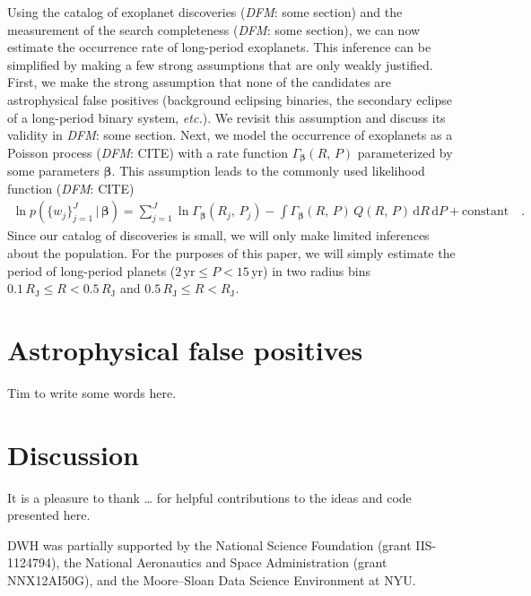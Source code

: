 \documentclass[manuscript, letterpaper]{aastex6}
\newcommand{\foreign}[1]{\emph{#1}}
\newcommand{\etc}{\foreign{etc.}}
\newcommand{\sectlabel}[1]{\label{sect:#1}}
\newcommand{\dd}{\ensuremath{\,\mathrm{d}}}
\newcommand{\bvec}[1]{{\ensuremath{\boldsymbol{#1}}}}
\newcommand{\todo}[3]{{\color{#2}\emph{#1}: #3}}
\newcommand{\dfmtodo}[1]{\todo{DFM}{red}{#1}}
\newcommand{\poppars}{{\ensuremath{\bvec{\beta}}}}
\newcommand{\rate}{{\ensuremath{\Gamma}}}
\begin{document}
Using the catalog of exoplanet discoveries (\dfmtodo{some section}) and the
measurement of the search completeness (\dfmtodo{some section}), we can now
estimate the occurrence rate of long-period exoplanets.
This inference can be simplified by making a few strong assumptions that are
only weakly justified.
First, we make the strong assumption that none of the candidates are
astrophysical false positives (background eclipsing binaries, the secondary
eclipse of a long-period binary system, \etc).
We revisit this assumption and discuss its validity in \dfmtodo{some section}.
Next, we model the occurrence of exoplanets as a Poisson process
(\dfmtodo{CITE}) with a rate function $\rate_{\poppars} (R,\,P)$ parameterized
by some parameters \poppars.
This assumption leads to the commonly used likelihood function
(\dfmtodo{CITE})
\begin{eqnarray}
\ln p (\{w_j\}_{j=1}^J\,|\,\poppars) =
    \sum_{j=1}^J \ln \rate_{\poppars} (R_j,\,P_j)
    - \int \rate_{\poppars} (R,\,P)\,Q(R,\,P)\dd R\dd P
    + \mathrm{constant} \quad.
\end{eqnarray}
Since our catalog of discoveries is small, we will only make limited
inferences about the population.
For the purposes of this paper, we will simply estimate the period of
long-period planets ($2\,\mathrm{yr} \le P < 15\,\mathrm{yr}$) in two radius
bins $0.1\,R_\mathrm{J} \le R < 0.5\,R_\mathrm{J}$ and $0.5\,R_\mathrm{J} \le
R < R_\mathrm{J}$.





\section{Astrophysical false positives}

Tim to write some words here.



\section{Discussion}\sectlabel{discussion}




It is a pleasure to thank
\ldots
for helpful contributions to the ideas and code presented here.

DWH was partially supported by the National Science Foundation (grant
IIS-1124794), the National Aeronautics and Space Administration (grant
NNX12AI50G), and the Moore--Sloan Data Science Environment at NYU.
\end{document}
